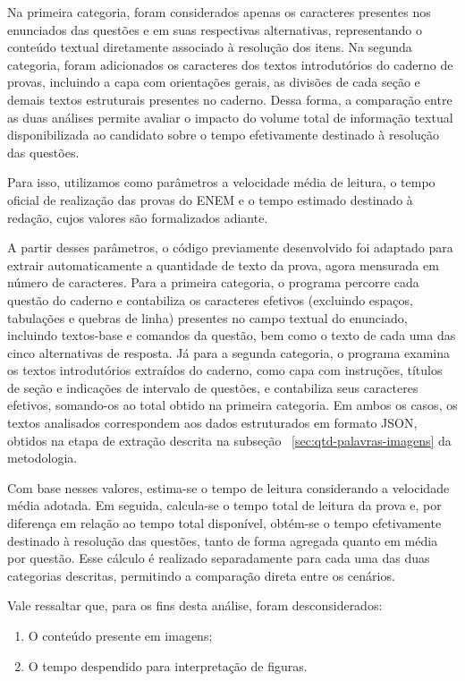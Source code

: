 \documentclass[a4paper,10pt, twocolumn]{article}
\begin{document}
Na primeira categoria, foram considerados apenas os caracteres presentes nos enunciados das questões e em suas respectivas alternativas, representando o conteúdo textual diretamente associado à resolução dos itens. Na segunda categoria, foram adicionados os caracteres dos textos introdutórios do caderno de provas, incluindo a capa com orientações gerais, as divisões de cada seção e demais textos estruturais presentes no caderno. Dessa forma, a comparação entre as duas análises permite avaliar o impacto do volume total de informação textual disponibilizada ao candidato sobre o tempo efetivamente destinado à resolução das questões.

Para isso, utilizamos como parâmetros a velocidade média de leitura, o tempo oficial de realização das provas do ENEM e o tempo estimado destinado à redação, cujos valores são formalizados adiante.

A partir desses parâmetros, o código previamente desenvolvido foi adaptado para extrair automaticamente a quantidade de texto da prova, agora mensurada em número de caracteres. Para a primeira categoria, o programa percorre cada questão do caderno e contabiliza os caracteres efetivos (excluindo espaços, tabulações e quebras de linha) presentes no campo textual do enunciado, incluindo textos-base e comandos da questão, bem como o texto de cada uma das cinco alternativas de resposta. Já para a segunda categoria, o programa examina os textos introdutórios extraídos do caderno, como capa com instruções, títulos de seção e indicações de intervalo de questões, e contabiliza seus caracteres efetivos, somando-os ao total obtido na primeira categoria. Em ambos os casos, os textos analisados correspondem aos dados estruturados em formato JSON, obtidos na etapa de extração descrita na subseção ~\ref{sec:qtd-palavras-imagens} da metodologia.

Com base nesses valores, estima-se o tempo de leitura considerando a velocidade média adotada. Em seguida, calcula-se o tempo total de leitura da prova e, por diferença em relação ao tempo total disponível, obtém-se o tempo efetivamente destinado à resolução das questões, tanto de forma agregada quanto em média por questão. Esse cálculo é realizado separadamente para cada uma das duas categorias descritas, permitindo a comparação direta entre os cenários.

Vale ressaltar que, para os fins desta análise, foram desconsiderados:
\begin{enumerate}
    \item O conteúdo presente em imagens;
    \item O tempo despendido para interpretação de figuras.
\end{enumerate}
\end{document}
